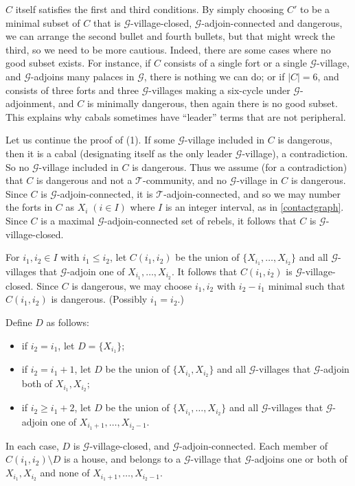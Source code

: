 \documentclass[10pt,a4paper]{amsart}
\theoremstyle{plain}
\def\LL{,\ldots,}
\newcommand{\mac}{\mathcal}
\def\LL{,\ldots,}
\newcommand{\mac}{\mathcal}
\begin{document}
	$C$ itself satisfies the first and third conditions. By simply choosing $C'$ to be a minimal subset of $C$ that
	is $\mac G$-village-closed,  $\mac G$-adjoin-connected and dangerous, we can arrange the second bullet and fourth bullets, but that might wreck the third,
	so we need to be more cautious. Indeed, there are some cases where no good subset exists. For instance, if $C$ consists of a 
	single fort or a single $\mac G$-village, and $\mac G$-adjoins many palaces in $\mac G$, there is nothing we can do; or if $|C|=6$,
	and consists of three forts and three $\mac G$-villages making a six-cycle under $\mac G$-adjoinment, and $C$ is minimally dangerous,
	then again there is no good subset. This explains why cabals sometimes have ``leader'' terms that are not peripheral. 
	
	Let us continue the proof of (1).
	If some $\mac G$-village included in $C$ is dangerous, then it is a cabal (designating itself as the only leader $\mac G$-village), a contradiction. So
	no $\mac G$-village included in $C$ is dangerous.
	Thus we assume (for a contradiction) that $C$ is dangerous and not a $\mac T$-community, and no $\mac G$-village in $C$ is dangerous.
	Since $C$ is $\mac G$-adjoin-connected, it is $\mac T$-adjoin-connected, and so we may number the forts in
	$C$ as $X_i\;(i\in I)$ where $I$ is an integer interval, as in \ref{contactgraph}.
	Since $C$ is a maximal $\mac G$-adjoin-connected set of rebels, it follows that $C$ is $\mac G$-village-closed.
	
	For $i_1,i_2\in I$ with $i_1\le i_2$, let $C(i_1,i_2)$ be the union of $\{X_{i_1}\LL X_{i_2}\}$ and all $\mac G$-villages that $\mac G$-adjoin
	one of $X_{i_1}\LL X_{i_2}$.
	It follows that
	$C(i_1,i_2)$ is $\mac G$-village-closed.
	Since $C$ is dangerous, we may choose $i_1,i_2$ with $i_2-i_1$ minimal such that $C(i_1,i_2)$ is dangerous. (Possibly $i_1=i_2$.)
	
	Define $D$ as follows:
	\begin{itemize}
		\item if $i_2=i_1$, let $D=\{X_{i_1}\}$;
		\item if $i_2=i_1+1$, let $D$ be the union of $\{X_{i_1}, X_{i_2}\}$ and all $\mac G$-villages that $\mac G$-adjoin  both of $X_{i_1}, X_{i_2}$;
		\item if $i_2\ge i_1+2$, let 
		$D$ be the union of $\{X_{i_1}\LL X_{i_2}\}$ and all $\mac G$-villages that $\mac G$-adjoin one of $X_{i_1+1}\LL X_{i_2-1}$.
	\end{itemize}
	In each case, 
	$D$ is $\mac G$-village-closed, and $\mac G$-adjoin-connected.
	Each member of $C(i_1,i_2)\setminus D$ is a house, and belongs to a $\mac G$-village that $\mac G$-adjoins one or both of $X_{i_1},X_{i_2}$ and none of
	$X_{i_1+1}\LL X_{i_2-1}$.
	
\end{document}
